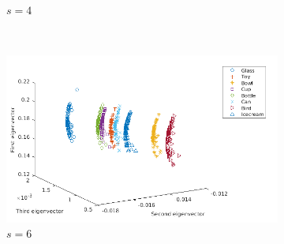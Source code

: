 \documentclass[10pt,a4paper]{article}
\theoremstyle{plain}
\theoremstyle{definition}
\begin{document}
\begin{figure}[H]
\begin{subfigure}[b]{0.5\textwidth}
		\caption{$s=4$}
		\label{}
	\end{subfigure}~
	\begin{subfigure}[b]{0.5\textwidth}
		\includegraphics[width= \textwidth]{images/Zeta-Mellin6.png}
		\caption{$s=6$}
		\label{}
	\end{subfigure}
	\caption{ }
	\label{}
\end{figure}
\end{document}
